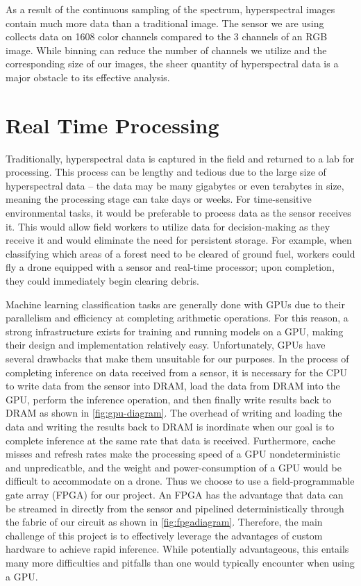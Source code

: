 \documentclass[psamsfonts]{amsart}
\newcommand{\mycomment}[1]{}
\theoremstyle{definition}
\theoremstyle{remark}
\numberwithin{equation}{section}
\begin{document}
As a result of the continuous sampling of the spectrum, hyperspectral images contain much more data than a traditional image. The sensor we are using collects data on 1608 color channels compared to the 3 channels of an RGB image. While binning can reduce the number of channels we utilize and the corresponding size of our images, the sheer quantity of hyperspectral data is a major obstacle to its effective analysis.

\section{Real Time Processing}
Traditionally, hyperspectral data is captured in the field and returned to a lab for processing. This process can be lengthy and tedious due to the large size of hyperspectral data -- the data may be many gigabytes or even terabytes in size, meaning the processing stage can take days or weeks.\mycomment{Note: is this true??} For time-sensitive environmental tasks, it would be preferable to process data as the sensor receives it. This would allow field workers to utilize data for decision-making as they receive it and would eliminate the need for persistent storage. For example, when classifying which areas of a forest need to be cleared of ground fuel, workers could fly a drone equipped with a sensor and real-time processor; upon completion, they could immediately begin clearing debris.

Machine learning classification tasks are generally done with GPUs due to their parallelism and efficiency at completing arithmetic operations. For this reason, a strong infrastructure exists for training and running models on a GPU, making their design and implementation relatively easy. Unfortunately, GPUs have several drawbacks that make them unsuitable for our purposes. In the process of completing inference on data received from a sensor, it is necessary for the CPU to write data from the sensor into DRAM, load the data from DRAM into the GPU, perform the inference operation, and then finally write results back to DRAM as shown in \autoref{fig:gpu-diagram}. The overhead of writing and loading the data and writing the results back to DRAM is inordinate when our goal is to complete inference at the same rate that data is received. Furthermore, cache misses and refresh rates make the processing speed of a GPU nondeterministic and unpredicatble, and the weight and power-consumption of a GPU would be difficult to accommodate on a drone. Thus we choose to use a field-programmable gate array (FPGA) for our project. An FPGA has the advantage that data can be streamed in directly from the sensor and pipelined deterministically through the fabric of our circuit as shown in \autoref{fig:fpgadiagram}. Therefore, the main challenge of this project is to effectively leverage the advantages of custom hardware to achieve rapid inference. While potentially advantageous, this entails many more difficulties and pitfalls than one would typically encounter when using a GPU.
\end{document}
